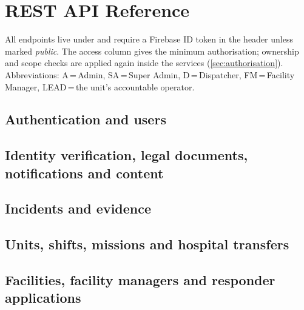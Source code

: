 \chapter{REST API Reference}\label{app:api}

All endpoints live under  and require a Firebase ID token in the 
header unless marked \emph{public}. The access column gives the minimum authorisation; ownership and scope
checks are applied again inside the services (\cref{sec:authorisation}). Abbreviations: A\,=\,Admin,
SA\,=\,Super Admin, D\,=\,Dispatcher, FM\,=\,Facility Manager, LEAD\,=\,the unit's accountable operator.

\section{Authentication and users}

\section{Identity verification, legal documents, notifications and content}

\section{Incidents and evidence}

\section{Units, shifts, missions and hospital transfers}

\section{Facilities, facility managers and responder applications}

